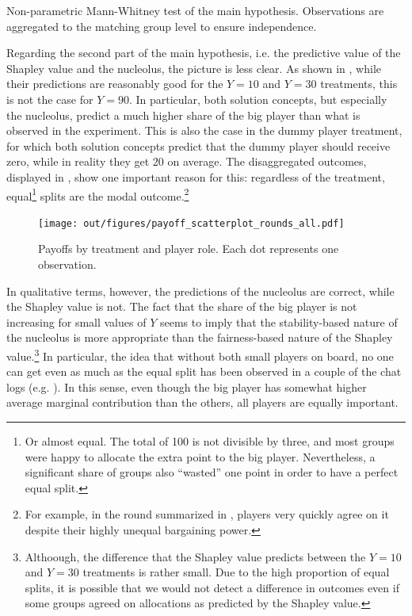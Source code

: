 \documentclass[12pt]{article}
\begin{document}
\begin{table}
    \centering
    
    \caption{Non-parametric Mann-Whitney test of the main hypothesis. Observations are aggregated to the matching group level to ensure independence.}
    \label{tab:main_nonparametric}
\end{table}

Regarding the second part of the main hypothesis, i.e. the predictive value of the Shapley value and the nucleolus, the picture is less clear. As shown in , while their predictions are reasonably good for the $Y=10$ and $Y=30$ treatments, this is not the case for $Y=90$. In particular, both solution concepts, but especially the nucleolus, predict a much higher share of the big player than what is observed in the experiment. This is also the case in the dummy player treatment, for which both solution concepts predict that the dummy player should receive zero, while in reality they get 20 on average. The disaggregated outcomes, displayed in , show one important reason for this: regardless of the treatment, equal\footnote{Or almost equal. The total of 100 is not divisible by three, and most groups were happy to allocate the extra point to the big player. Nevertheless, a significant share of groups also ``wasted'' one point in order to have a perfect equal split.} splits are the modal outcome.\footnote{For example, in the round summarized in , players very quickly agree on it despite their highly unequal bargaining power.}

\begin{figure}
    \centering
    \texttt{[image: out/figures/payoff\_scatterplot\_rounds\_all.pdf]}
    \caption{Payoffs by treatment and player role. Each dot represents one observation.}
    \label{fig:main_scatter}
\end{figure}

In qualitative terms, however, the predictions of the nucleolus are correct, while the Shapley value is not. The fact that the share of the big player is not increasing for small values of $Y$ seems to imply that the stability-based nature of the nucleolus is more appropriate than the fairness-based nature of the Shapley value.\footnote{Althoough, the difference that the Shapley value predicts between the $Y=10$ and $Y=30$ treatments is rather small. Due to the high proportion of equal splits, it is possible that we would not detect a difference in outcomes even if some groups agreed on allocations as predicted by the Shapley value.} In particular, the idea that without both small players on board, no one can get even as much as the equal split has been observed in a couple of the chat logs (e.g. ). In this sense, even though the big player has somewhat higher average marginal contribution than the others, all players are equally important. 
\end{document}
